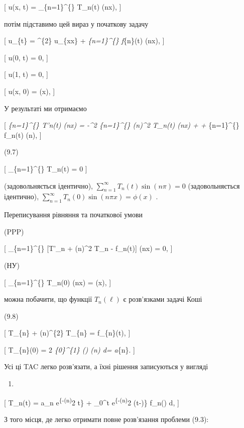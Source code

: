 \documentclass[
  ukrainian,
]{article}
\providecommand{\tightlist}{%
  \setlength{\itemsep}{0pt}\setlength{\parskip}{0pt}}
\begin{document}
{[} u(x, t) = \sum\_\{n=1\}\^{}\{\infty\} T\_n(t) \sin(n\pi x), {]}

потім підставимо цей вираз у початкову задачу

{[} u\_\{t\} = \alpha\^{}\{2\} u\_\{xx\} +
\sum\emph{\{n=1\}\^{}\{\infty\} f}\{n\}(t) \sin(n\pi x), {]}

{[} u(0, t) = 0, {]}

{[} u(1, t) = 0, {]}

{[} u(x, 0) = \varphi(x), {]}

У результаті ми отримаємо

{[} \sum\emph{\{n=1\}\^{}\{\infty\} T'\emph{n(t) \sin(n\pi x) =
-\alpha\^{}2 \sum}\{n=1\}\^{}\{\infty\} (n\pi)\^{}2 T\_n(t) \sin(n\pi x)
+ + \sum}\{n=1\}\^{}\{\infty\} f\_n(t) \sin(\pi n\lambda), {]}

(9.7)

{[} \sum\_\{n=1\}\^{}\{\infty\} T\_n(t)  = 0 {]}

(задовольняється ідентично),
\(\sum_{n=1}^{\infty} T_n(t) \sin (n\pi) = 0\) (задовольняється
ідентично), \(\sum_{n=1}^{\infty} T_n(0) \sin (n\pi x) = \phi(x)\) .

Переписування рівняння та початкової умови

(PPP)

{[} \sum\_\{n=1\}\^{}\{\infty\} {[}T'\_n + (n\pi\alpha)\^{}2 T\_n -
f\_n(t){]} \sin(n\pi x) = 0, {]}

(НУ)

{[} \sum\_\{n=1\}\^{}\{\infty\} T\_n(0) \sin(n\pi x) = \varphi(x), {]}

можна побачити, що функції \(T_n(\ell)\) є розв'язками задачі Коші

(9.8)

{[} T\_\{n\} + (n\pi\alpha)\^{}\{2\} T\_\{n\} = f\_\{n\}(t), {]}

{[} T\_\{n\}(0) = 2 \int\emph{\{0\}\^{}\{1\} \varphi(\xi) \sin(n\pi\xi)
d\xi = a}\{n\}. {]}

Усі ці TAC легко розв'язати, а їхні рішення записуються у вигляді

\begin{enumerate}
\def\labelenumi{(\arabic{enumi})}
\setcounter{enumi}{98}
\tightlist
\item
\end{enumerate}

{[} T\_n(t) = a\_n e\textsuperscript{\{-(n\pi\alpha)}2 t\} +
\int\_0\^{}t e\textsuperscript{\{-(n\pi\alpha)}2 (t-\tau)\} f\_n(\tau)
d\tau, {]}

З того місця, де легко отримати повне розв'язання проблеми (9.3):
\end{document}
